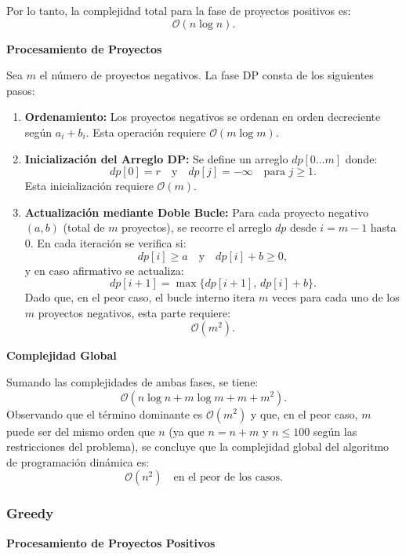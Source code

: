 ﻿\documentclass{article}
\theoremstyle{plain}
\theoremstyle{definition}
\begin{document}
Por lo tanto, la complejidad total para la fase de proyectos positivos es:
\[
\mathcal{O}(n\log n).
\]

\textbf{Procesamiento de Proyectos}

Sea \(m\) el número de proyectos negativos. La fase DP consta de los siguientes pasos:

\begin{enumerate}
    \item \textbf{Ordenamiento:}  
    Los proyectos negativos se ordenan en orden decreciente según \(a_i+b_i\). Esta operación requiere \(\mathcal{O}(m\log m)\).
    
    \item \textbf{Inicialización del Arreglo DP:}  
    Se define un arreglo \(dp[0 \ldots m]\) donde:
    \[
    dp[0] = r \quad \text{y} \quad dp[j] = -\infty \quad \text{para } j \ge 1.
    \]
    Esta inicialización requiere \(\mathcal{O}(m)\).
    
    \item \textbf{Actualización mediante Doble Bucle:}  
    Para cada proyecto negativo \((a,b)\) (total de \(m\) proyectos), se recorre el arreglo \(dp\) desde \(i = m-1\) hasta \(0\). En cada iteración se verifica si:
    \[
    dp[i] \ge a \quad \text{y} \quad dp[i] + b \ge 0,
    \]
    y en caso afirmativo se actualiza:
    \[
    dp[i+1] = \max\{dp[i+1],\, dp[i]+b\}.
    \]
    Dado que, en el peor caso, el bucle interno itera \(m\) veces para cada uno de los \(m\) proyectos negativos, esta parte requiere:
    \[
    \mathcal{O}(m^2).
    \]
\end{enumerate}

\textbf{Complejidad Global}

Sumando las complejidades de ambas fases, se tiene:
\[
\mathcal{O}(n\log n + m\log m + m + m^2).
\]
Observando que el término dominante es \(\mathcal{O}(m^2)\) y que, en el peor caso, \(m\) puede ser del mismo orden que \(n\) (ya que \(n = n + m\) y \(n \leq 100\) según las restricciones del problema), se concluye que la complejidad global del algoritmo de programación dinámica es:
\[
\boxed{\mathcal{O}(n^2) \quad \text{en el peor de los casos.}}
\]

\subsubsection{Greedy}

\textbf{Procesamiento de Proyectos Positivos}
\\
\end{document}
